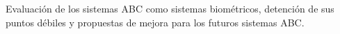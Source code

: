 Evaluación de los sistemas ABC como sistemas biométricos, detención de sus puntos débiles y propuestas de mejora para los futuros sistemas ABC.







